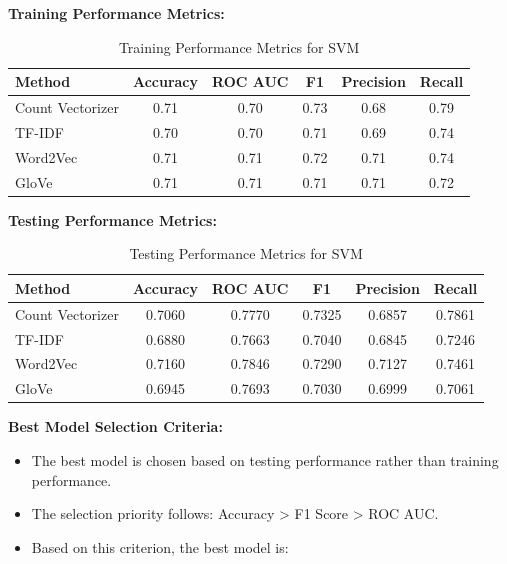 \textbf{Training Performance Metrics:}

\begin{table}[H]
    \centering
    \caption{Training Performance Metrics for SVM}
    \label{tab:svm-training-metrics}
    \begin{tabular}{|l|c|c|c|c|c|}
        \hline
        \textbf{Method} & \textbf{Accuracy} & \textbf{ROC AUC} & \textbf{F1} & \textbf{Precision} & \textbf{Recall} \\ 
        \hline
        Count Vectorizer & 0.71 & 0.70 & 0.73 & 0.68 & 0.79 \\ 
        \hline
        TF-IDF & 0.70 & 0.70 & 0.71 & 0.69 & 0.74 \\ 
        \hline
        Word2Vec & 0.71 & 0.71 & 0.72 & 0.71 & 0.74 \\ 
        \hline
        GloVe & 0.71 & 0.71 & 0.71 & 0.71 & 0.72 \\ 
        \hline
    \end{tabular}
\end{table}

\textbf{Testing Performance Metrics:}

\begin{table}[H]
    \centering
    \caption{Testing Performance Metrics for SVM}
    \label{tab:svm-testing-metrics}
    \begin{tabular}{|l|c|c|c|c|c|}
        \hline
        \textbf{Method} & \textbf{Accuracy} & \textbf{ROC AUC} & \textbf{F1} & \textbf{Precision} & \textbf{Recall} \\ 
        \hline
        Count Vectorizer & 0.7060 & 0.7770 & 0.7325 & 0.6857 & 0.7861 \\ 
        \hline
        TF-IDF & 0.6880 & 0.7663 & 0.7040 & 0.6845 & 0.7246 \\ 
        \hline
        Word2Vec & 0.7160 & 0.7846 & 0.7290 & 0.7127 & 0.7461 \\ 
        \hline
        GloVe & 0.6945 & 0.7693 & 0.7030 & 0.6999 & 0.7061 \\ 
        \hline
    \end{tabular}
\end{table}

\textbf{Best Model Selection Criteria:}

\begin{itemize}
    \item The best model is chosen based on testing performance rather than training performance.
    \item The selection priority follows: Accuracy > F1 Score > ROC AUC.
    \item Based on this criterion, the best model is:
\end{itemize}

